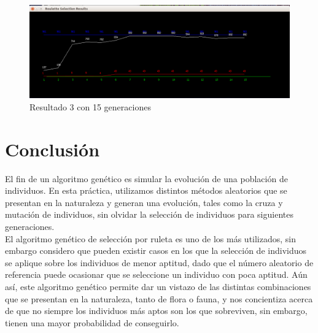 \documentclass[11pt,letterpaper]{article}
\begin{document}
\begin{figure}[H]
	\centering
	\includegraphics[scale = 0.4]{images/15gen3}
	\caption{Resultado 3 con 15 generaciones}
\end{figure}


\section*{Conclusión}

El fin de un algoritmo genético es simular la evolución de una población de individuos. En esta práctica, utilizamos distintos métodos aleatorios que se presentan en la naturaleza y generan una evolución, tales como la cruza y mutación de individuos, sin olvidar la selección de individuos para siguientes generaciones.\\

El algoritmo genético de selección por ruleta es uno de los más utilizados, sin embargo considero que pueden existir casos en los que la selección de individuos se aplique sobre los individuos de menor aptitud, dado que el número aleatorio de referencia puede ocasionar que se seleccione un individuo con poca aptitud. Aún así, este algoritmo genético permite dar un vistazo de las distintas combinaciones que se presentan en la naturaleza, tanto de flora o fauna, y nos concientiza acerca de que no siempre los individuos más aptos son los que sobreviven, sin embargo, tienen una mayor probabilidad de conseguirlo.
\end{document}

